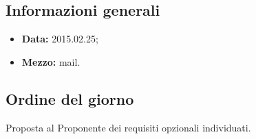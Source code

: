 \subsection{Informazioni generali}
\begin{itemize}
	\item \textbf{Data:} 2015.02.25;
	\item \textbf{Mezzo:} mail.
\end{itemize}

\subsection{Ordine del giorno}
Proposta al Proponente dei requisiti opzionali individuati.
